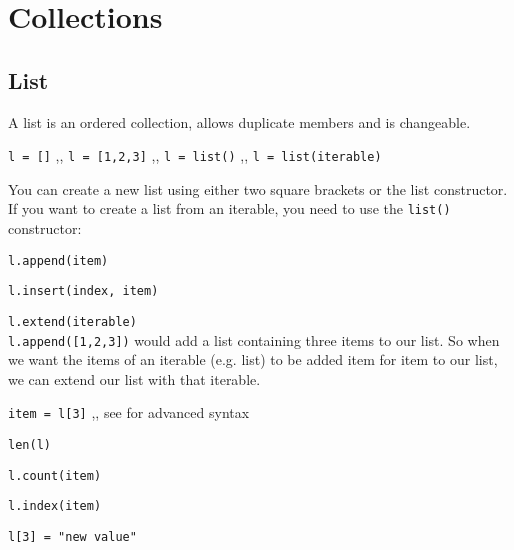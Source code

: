 \section{Collections}

  \subsection{List} \label{List}
    A list is an ordered collection, allows duplicate members and is changeable.

    \begin{itemize}
       \texttt{l = []} \sep{,} \texttt{l = [1,2,3]} \sep{,}
      \texttt{l = list()} \sep{,} \texttt{l = list(iterable)}

      You can create a new list using either two square brackets or the list constructor.
      If you want to create a list from an iterable, you need to use the
      \texttt{list()} constructor:


       \texttt{l.append(item)}

       \texttt{l.insert(index, item)}

       \texttt{l.extend(iterable)} \\
      \texttt{l.append([1,2,3])} would add a list containing three items to our list.
      So when we want the items of an iterable (e.g. list) to be added item for item to our list,
      we can extend our list with that iterable.


       \texttt{item = l[3]} \sep{,}
      see  for advanced syntax

       \texttt{len(l)}

       \texttt{l.count(item)}

       \texttt{l.index(item)}

       \texttt{l[3] = "new value"}


\end{itemize}
